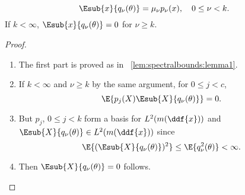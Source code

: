 \documentclass[12pt]{article}
\begin{document}
\begin{lemma}
    \label{lem:spectralbounds:lemma2} %
    \[
        \Esub{x}{q_{\nu}(\theta)} = \mu_{\nu} p_{\nu}(x), \quad 0 \le
        \nu < k.
    \] If \( k < \infty \), \( \Esub{x}{q_{\nu}(\theta)} = 0 \) for \(
    \nu \ge k \).
\end{lemma}

\begin{proof}
    \begin{enumerate}
        \item
            The first part is proved as in~%
            \ref{lem:spectralbounds:lemma1}.
        \item
            If \( k < \infty \) and \( \nu \ge k \) by the same
            argument, for \( 0 \le j <c \),
            \[
                \E{p_j(X) \Esub{X}{q_{\nu}(\theta)} }=0.
            \]
        \item
            But \( p_j \), \( 0 \le j < k \) form a basis for \( L^2(m(\ddf
            {x})) \) and \( \Esub{X}{q_{\nu}(\theta)} \in L^2(m(\ddf{x}))
            \) since
            \[
                \E{ (\Esub{X}{q_{\nu}(\theta)})^2 } \le \E{ q_{\nu}^{2}(\theta)}
                < \infty.
            \]
        \item
            Then \( \Esub{X}{q_{\nu}(\theta)} = 0 \) follows.
    \end{enumerate}
\end{proof}
\end{document}
